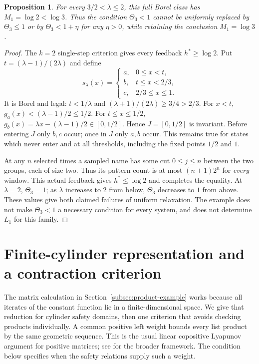 \documentclass[11pt,reqno]{amsart}
\numberwithin{equation}{section}
\newtheorem{proposition}[theorem]{Proposition}
\theoremstyle{definition}
\theoremstyle{definition}
\begin{document}
\begin{proposition}\label{prop:critical}
For every $3/2<\lambda\le2$, this full Borel class has
$M_1=\log2<\log3$. Thus the condition $\Theta_3<1$ cannot be
uniformly replaced by $\Theta_3\le1$ or by
$\Theta_3<1+\eta$ for any $\eta>0$, while retaining the
conclusion $M_1=\log3$.
\end{proposition}
\begin{proof}
The $k=2$ single-step criterion gives every feedback
$h^*\ge\log2$. Put $t=(\lambda-1)/(2\lambda)$ and define
\[
 s_\lambda(x)=\begin{cases}
 a,&0\le x<t,\\ b,&t\le x<2/3,\\ c,&2/3\le x\le1.
 \end{cases}
\]
It is Borel and legal: $t<1/\lambda$ and
$(\lambda+1)/(2\lambda)\ge3/4>2/3$.
For $x<t$, $g_a(x)<(\lambda-1)/2\le1/2$.
For $t\le x\le1/2$,
$g_b(x)=\lambda x-(\lambda-1)/2\in[0,1/2]$.
Hence $J=[0,1/2]$ is invariant. Before entering $J$ only
$b,c$ occur; once in $J$ only $a,b$ occur. This remains true
for states which never enter and at all thresholds, including the
fixed points $1/2$ and $1$.

At any $n$ selected times a sampled name has some cut $0\le j\le n$
between the two groups, each of size two. Thus its pattern count
is at most $(n+1)2^n$ for \emph{every} window. This actual
feedback gives $h^*\le\log2$ and completes the equality.
At $\lambda=2$, $\Theta_3=1$; as $\lambda$ increases to $2$
from below, $\Theta_3$ decreases to $1$ from above. These values
give both claimed failures of uniform relaxation. The example
does not make $\Theta_3<1$ a necessary condition for every
system, and does not determine $L_1$ for this family.
\end{proof}

\section{Finite-cylinder representation and a contraction criterion}\label{sec:cylinder}

The matrix calculation in Section~\ref{subsec:product-example} works
because all iterates of the constant function lie in a finite-dimensional
space. We give that reduction for cylinder safety domains, then one
criterion that avoids checking products individually. A common positive
left weight bounds every list product by the same geometric sequence.
This is the usual linear copositive Lyapunov argument for positive
matrices; see \cite{Debauche2022} for the broader framework. The
condition below specifies when the safety relations supply such a weight.
\end{document}
